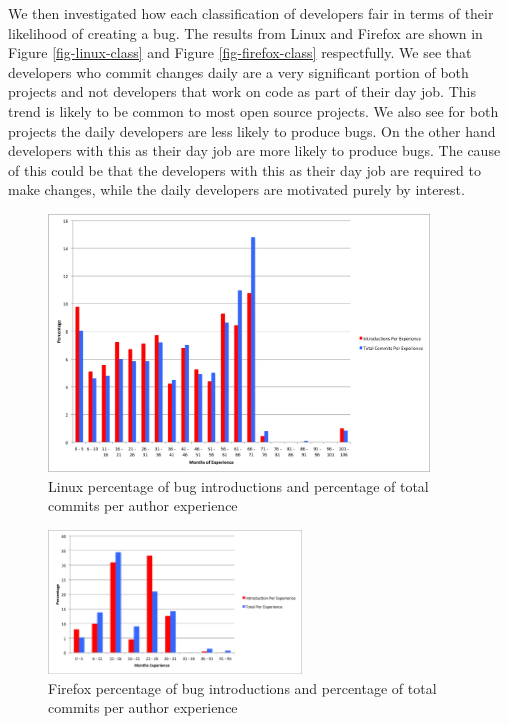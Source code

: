 \documentclass[preprint, 11pt]{sigplanconf}
\begin{document}
We then investigated how each classification of developers fair in
terms of their likelihood of creating a bug. The results from Linux
and Firefox are shown in Figure \ref{fig-linux-class} and Figure
\ref{fig-firefox-class} respectfully. We see that developers who
commit changes daily are a very significant portion of both projects
and not developers that work on code as part of their day job. This
trend is likely to be common to most open source projects. We also see
for both projects the daily developers are less likely to produce
bugs. On the other hand developers with this as their day job are more
likely to produce bugs. The cause of this could be that the developers
with this as their day job are required to make changes, while the
daily developers are motivated purely by interest.

\begin{figure}
\begin{center}
\includegraphics[width=0.9\textwidth]{linux_day_per_experience.png}
\end{center}
\caption{Linux percentage of bug introductions and percentage of total commits per author experience}
\label{fig-linux-experience}
\end{figure}

\begin{figure}
\begin{center}
\includegraphics[width=0.6\textwidth]{firefox_day_per_experience.png}
\end{center}
\caption{Firefox percentage of bug introductions and percentage of total commits per author experience}
\label{fig-firefox-experience}
\end{figure}
\end{document}
